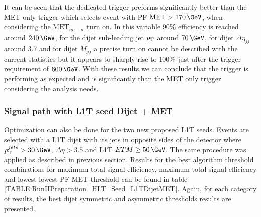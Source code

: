 It can be seen that the dedicated trigger preforms significantly better than the \gls{MET} only trigger which selects event with \gls{PF} $\text{MET}>170\,\GeV$, when considering the $\text{MET}_{no-\mu}$ turn on. In this variable 90\% efficiency is reached around 
$240\,\GeV$, for the dijet sub-leading jet $p_{\mathrm{T}}$ around $70\,\GeV$, for dijet $\Delta\eta_{jj}$ around 3.7 and for dijet $M_{jj}$ a precise turn on cannot be described with the current statistics but it appears to sharply rise to 100\% just after the trigger requirement of $600\,\GeV$. With these results we can conclude that the trigger is performing as expected and is significantly than the \gls{MET} only trigger considering the analysis needs.

\subsubsection{Signal path with L1T seed Dijet + MET}
\label{SECTION:RunIITriggerStudies_HLTAlgorithmDevelopment_L1TDijetMET}


Optimization can also be done for the two new proposed \gls{L1T} seeds. Events are selected with a \gls{L1T} dijet with its jets in opposite sides of the detector where $\pt^{jets}>30\,\GeV$, $\Delta\eta>3.5$ and \gls{L1T} $ETM \geq 50\,\GeV$. The same procedure was applied as described in previous section. Results for the best algorithm threshold combinations for maximum total signal efficiency, maximum total signal efficiency and lowest lowest \gls{PF} \gls{MET} threshold can be found in table \ref{TABLE:RunIIPreparation_HLT_Seed_L1TDijetMET}. Again, for each category of results, the best dijet symmetric and asymmetric \pt thresholds results are presented.

